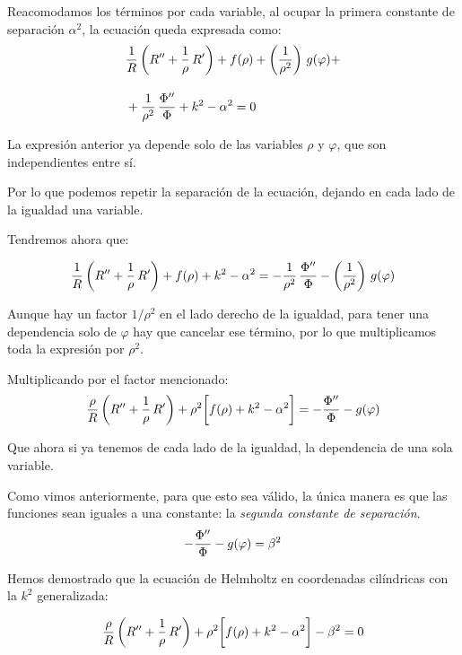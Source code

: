 Reacomodamos los términos por cada variable, al ocupar la primera constante de separación $\alpha^{2}$, la ecuación queda expresada como:
\begin{align*}
&{} \dfrac{1}{R} \left( {R}^{\prime \prime} + \dfrac{1}{\rho} \, {R}^{\prime} \right) +  f(\rho) + \left( \dfrac{1}{\rho^{2}} \right) \, g(\varphi) + \\[1em]
&+ \dfrac{1}{\rho^{2}} \, \dfrac{{\Phi}^{\prime \prime}}{\Phi} + k^{2} - \alpha^{2} = 0
\end{align*}

La expresión anterior ya depende solo de las variables $\rho$ y $\varphi$, que son independientes entre sí.
\par
Por lo que podemos repetir la separación de la ecuación, dejando en cada lado de la igualdad una variable.

Tendremos ahora que:

\begin{align*}
\dfrac{1}{R} \left( {R}^{\prime \prime} + \dfrac{1}{\rho} \, {R}^{\prime} \right) + f(\rho) + k^{2} - \alpha^{2} = - \dfrac{1}{\rho^{2}} \, \dfrac{{\Phi}^{\prime \prime}}{\Phi} - \left( \dfrac{1}{\rho^{2}} \right) \, g(\varphi)
\end{align*}

Aunque hay un factor $1/\rho^{2}$ en el lado derecho de la igualdad, para tener una dependencia solo de $\varphi$ hay que cancelar ese término,  por lo que multiplicamos toda la expresión por $\rho^{2}$.

Multiplicando por el factor mencionado:
\begin{align*}
\dfrac{\rho}{R} \left( {R}^{\prime \prime} + \dfrac{1}{\rho} \, {R}^{\prime} \right) + \rho^{2} \bigg[ f(\rho) + k^{2} - \alpha^{2} \bigg] = - \dfrac{{\Phi}^{\prime \prime}}{\Phi} - g(\varphi)
\end{align*}

Que ahora si ya tenemos de cada lado de la igualdad, la dependencia de una sola variable.
\par
Como vimos anteriormente, para que esto sea válido, la única manera es que las funciones sean iguales a una constante:  la \emph{segunda constante de separación}.
\begin{align*}
- \dfrac{{\Phi}^{\prime \prime}}{\Phi} - g(\varphi) = \beta^{2}
\end{align*}

Hemos demostrado que la ecuación de Helmholtz en coordenadas cilíndricas con la $k^{2}$ generalizada:

\begin{align*}
\dfrac{\rho}{R} \left( {R}^{\prime \prime} + \dfrac{1}{\rho} \, {R}^{\prime} \right) + \rho^{2} \bigg[ f(\rho) + k^{2} - \alpha^{2} \bigg] - \beta^{2} = 0
\end{align*}

